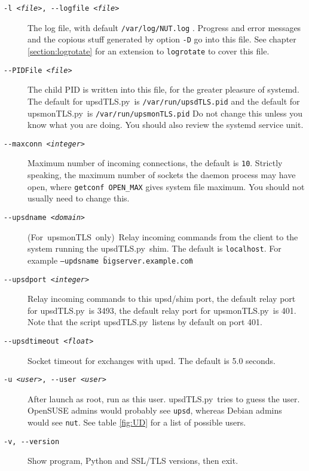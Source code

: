 \documentclass[12pt]{article}
\newcommand{\upsd}{\mbox{\textcolor{UPSDCOLOUR}{upsd}}}
\newcommand{\upsdTLS}{\mbox{\textcolor{UPSDCOLOUR}{upsdTLS.py}}}
\newcommand{\upsmonTLS}{\mbox{\textcolor{UPSMONCOLOUR}{upsmonTLS.py}}}
\newcommand{\upsmonTLSonly}{\mbox{\textcolor{UPSMONCOLOUR}{(For upsmonTLS only)}}}
\begin{document}
\begin{description}
\item[\texttt{-l \textit{<file>}, -\/-logfile \textit{<file>}}] The log file,
  with default \texttt{/var/log/NUT.log} . Progress and error messages and the
  copious stuff generated by option \texttt{-D} go into this file.  See
  chapter \ref{section:logrotate} for an extension to \texttt{logrotate} to
  cover this file.

\item[\texttt{-\/-PIDFile \textit{<file>}}] The child PID is written into this
  file, for the greater pleasure of systemd.  The default for \upsdTLS\ is
  \texttt{/var/run/upsdTLS.pid} and the default for \upsmonTLS\ is
  \texttt{/var/run/upsmonTLS.pid} Do not change this unless you know what you
  are doing.  You should also review the systemd service unit.

\item[\texttt{-\/-maxconn \textit{<integer>}}] Maximum number of incoming
  connections, the default is \texttt{10}.  Strictly speaking, the maximum
  number of sockets the daemon process may have open, where \texttt{getconf
    OPEN\_MAX} gives system file maximum.  You should not usually need to
  change this.

\item[\texttt{-\/-upsdname \textit{<domain>}}] \upsmonTLSonly\ Relay incoming
  commands from the client to the system running the \upsdTLS\ shim.  The
  default is \texttt{localhost}.  For example \texttt{--updsname
    \"bigserver.example.com\"}

\item[\texttt{-\/-upsdport \textit{<integer>}}] Relay incoming commands to
  this upsd/shim port, the default relay port for \upsdTLS\ is 3493, the
  default relay port for \upsmonTLS\ is 401.  Note that the script
  \upsdTLS\ listens by default on port 401.

\item[\texttt{-\/-upsdtimeout \textit{<float>}}] Socket timeout for exchanges
  with \upsd. The default is 5.0 seconds.

\item[\texttt{-u \textit{<user>}, -\/-user \textit{<user>}}] After launch as
  root, run as this user.  \upsdTLS\ tries to guess the user. OpenSUSE admins
  would probably see \texttt{upsd}, whereas Debian admins would see
  \texttt{nut}.  See table \ref{fig:UD} for a list of possible users.

\item[\texttt{-v, -\/-version}] Show program, Python and SSL/TLS versions,
  then exit.

\end{description}
\end{document}
